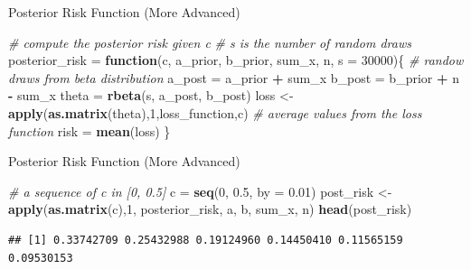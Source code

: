 \documentclass[
  ignorenonframetext,
]{beamer}
\newenvironment{Shaded}{\begin{snugshade}}{\end{snugshade}}
\newcommand{\CommentTok}[1]{\textcolor[rgb]{0.56,0.35,0.01}{\textit{#1}}}
\newcommand{\ControlFlowTok}[1]{\textcolor[rgb]{0.13,0.29,0.53}{\textbf{#1}}}
\newcommand{\DataTypeTok}[1]{\textcolor[rgb]{0.13,0.29,0.53}{#1}}
\newcommand{\DecValTok}[1]{\textcolor[rgb]{0.00,0.00,0.81}{#1}}
\newcommand{\FloatTok}[1]{\textcolor[rgb]{0.00,0.00,0.81}{#1}}
\newcommand{\KeywordTok}[1]{\textcolor[rgb]{0.13,0.29,0.53}{\textbf{#1}}}
\newcommand{\NormalTok}[1]{#1}
\newcommand{\OperatorTok}[1]{\textcolor[rgb]{0.81,0.36,0.00}{\textbf{#1}}}
\newcommand{\StringTok}[1]{\textcolor[rgb]{0.31,0.60,0.02}{#1}}
\begin{document}
\begin{frame}[fragile]{Posterior Risk Function (More Advanced)}
\protect\hypertarget{posterior-risk-function-more-advanced}{}

\begin{Shaded}
\begin{Highlighting}[]
\CommentTok{# compute the posterior risk given c }
\CommentTok{# s is the number of random draws }
\NormalTok{posterior_risk =}\StringTok{ }\ControlFlowTok{function}\NormalTok{(c, a_prior, b_prior, }
\NormalTok{                          sum_x, n, }\DataTypeTok{s =} \DecValTok{30000}\NormalTok{)\{}
  \CommentTok{# randow draws from beta distribution }
\NormalTok{  a_post =}\StringTok{ }\NormalTok{a_prior }\OperatorTok{+}\StringTok{ }\NormalTok{sum_x}
\NormalTok{  b_post =}\StringTok{ }\NormalTok{b_prior }\OperatorTok{+}\StringTok{ }\NormalTok{n }\OperatorTok{-}\StringTok{ }\NormalTok{sum_x}
\NormalTok{  theta =}\StringTok{ }\KeywordTok{rbeta}\NormalTok{(s, a_post, b_post)}
\NormalTok{  loss <-}\StringTok{ }\KeywordTok{apply}\NormalTok{(}\KeywordTok{as.matrix}\NormalTok{(theta),}\DecValTok{1}\NormalTok{,loss_function,c)}
  \CommentTok{# average values from the loss function}
\NormalTok{  risk =}\StringTok{ }\KeywordTok{mean}\NormalTok{(loss)}
\NormalTok{\}}
\end{Highlighting}
\end{Shaded}

\end{frame}

\begin{frame}[fragile]{Posterior Risk Function (More Advanced)}
\protect\hypertarget{posterior-risk-function-more-advanced-1}{}

\begin{Shaded}
\begin{Highlighting}[]
\CommentTok{# a sequence of c in [0, 0.5]}
\NormalTok{c =}\StringTok{ }\KeywordTok{seq}\NormalTok{(}\DecValTok{0}\NormalTok{, }\FloatTok{0.5}\NormalTok{, }\DataTypeTok{by =} \FloatTok{0.01}\NormalTok{)}
\NormalTok{post_risk <-}\StringTok{ }\KeywordTok{apply}\NormalTok{(}\KeywordTok{as.matrix}\NormalTok{(c),}\DecValTok{1}\NormalTok{,}
\NormalTok{                   posterior_risk, a, b, sum_x, n)}
\KeywordTok{head}\NormalTok{(post_risk)}
\end{Highlighting}
\end{Shaded}

\begin{verbatim}
## [1] 0.33742709 0.25432988 0.19124960 0.14450410 0.11565159 0.09530153
\end{verbatim}

\end{frame}
\end{document}
